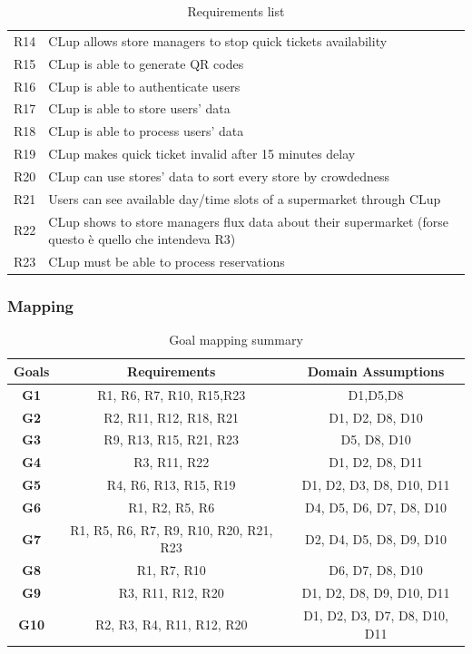 \begin{table}[H]
\begin{tabular}{l|l}
	R14 & CLup allows store managers to stop quick tickets availability \\
	R15 & CLup is able to generate QR codes\\
	R16 & CLup is able to authenticate users\\
	R17 & CLup is able to store users’ data \\
	R18 & CLup is able to process users' data \\
	R19 & CLup makes quick ticket invalid after 15 minutes delay\\
	R20 & CLup can use stores’ data to sort every store by crowdedness \\
	R21 & Users can see available day/time slots of a supermarket through CLup\\
	R22 & CLup shows to store managers flux data about their supermarket (forse questo è quello che intendeva R3)\\
	R23 & CLup must be able to process reservations\\
	
\end{tabular}
\caption{Requirements list}
\label{tab: ReqList}
\end{table}

\subsubsection{Mapping}
\begin{table} [H]
	\begin{tabular}{c|c|c}
		\textbf{Goals} & \textbf{Requirements} & \textbf{Domain Assumptions}\\
		\hline
		\textbf{G1} & R1, R6, R7, R10, R15,R23 & D1,D5,D8\\
		\hline
		\textbf{G2} & R2, R11, R12, R18, R21 & D1, D2, D8, D10\\
		\hline
		\textbf{G3} & R9, R13, R15, R21, R23 & D5, D8, D10\\
		\hline
		\textbf{G4} & R3, R11, R22 & D1, D2, D8, D11\\
		\hline
		\textbf{G5} & R4, R6, R13, R15, R19 & D1, D2, D3, D8, D10, D11\\
		\hline
		\textbf{G6} & R1, R2, R5, R6 & D4, D5, D6, D7, D8, D10\\
		\hline
		\textbf{G7} & R1, R5, R6, R7, R9, R10, R20, R21, R23 & D2, D4, D5, D8, D9, D10\\
		\hline
		\textbf{G8} & R1, R7, R10 & D6, D7, D8, D10\\
		\hline
		\textbf{G9} & R3, R11, R12, R20 & D1, D2, D8, D9, D10, D11\\
		\hline
		\textbf{G10} & R2, R3, R4, R11, R12, R20 & D1, D2, D3, D7, D8, D10, D11\\
	\end{tabular}
	\caption{Goal mapping summary}
	\label{tab:MappingSum}
\end{table}

